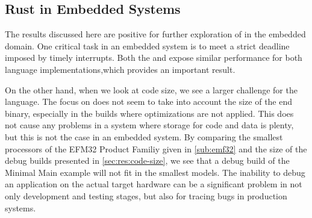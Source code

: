 \subsection{Rust in Embedded Systems}

The results discussed here are positive for further exploration of {\rust} in the embedded domain.
One critical task in an embedded system is to meet a strict deadline imposed by timely interrupts.
Both the {\tracker} and {\cg} expose similar performance for both language implementations,which provides an important result.

On the other hand, when we look at code size, we see a larger challenge for the {\rust} language.
The focus on  does not seem to take into account the size of the end binary, especially in the builds where optimizations are not applied.
This does not cause any problems in a system where storage for code and data is plenty, but this is not the case in an embedded system.
By comparing the smallest processors of the EFM32 Product Familiy given in \autoref{sub:emf32} and the size of the debug builds presented in \autoref{sec:res:code-size}, we see that a debug build of the Minimal Main example will not fit in the smallest models.
The inability to debug an application on the actual target hardware can be a significant problem in not only development and testing stages, but also for tracing bugs in production systems.
